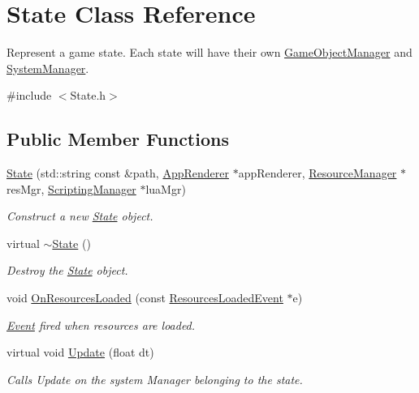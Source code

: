 \hypertarget{classState}{}\section{State Class Reference}
\label{classState}


Represent a game state. Each state will have their own \hyperlink{classGameObjectManager}{Game\+Object\+Manager} and \hyperlink{classSystemManager}{System\+Manager}.  




{\ttfamily \#include $<$State.\+h$>$}

\subsection*{Public Member Functions}
\begin{DoxyCompactItemize}
\item 
\hyperlink{classState_a935578b20d60c6ed193e96ceec1201be}{State} (std\+::string const \&path, \hyperlink{classAppRenderer}{App\+Renderer} $\ast$app\+Renderer, \hyperlink{classResourceManager}{Resource\+Manager} $\ast$res\+Mgr, \hyperlink{classScriptingManager}{Scripting\+Manager} $\ast$lua\+Mgr)
\begin{DoxyCompactList}\small\item\em Construct a new \hyperlink{classState}{State} object. \end{DoxyCompactList}\item 
\mbox{\label{classState_afab438d92b90dc18d194dbd9c9c8bab3}} 
virtual \hyperlink{classState_afab438d92b90dc18d194dbd9c9c8bab3}{$\sim$\+State} ()
\begin{DoxyCompactList}\small\item\em Destroy the \hyperlink{classState}{State} object. \end{DoxyCompactList}\item 
void \hyperlink{classState_a5c3567e3ce68f000e96901099c92eda5}{On\+Resources\+Loaded} (const \hyperlink{classResourcesLoadedEvent}{Resources\+Loaded\+Event} $\ast$e)
\begin{DoxyCompactList}\small\item\em \hyperlink{classEvent}{Event} fired when resources are loaded. \end{DoxyCompactList}\item 
virtual void \hyperlink{classState_a1660e74611d9e044a136bea1f96b8f8b}{Update} (float dt)
\begin{DoxyCompactList}\small\item\em Calls Update on the system Manager belonging to the state. \end{DoxyCompactList}\item 

\end{DoxyCompactItemize}
